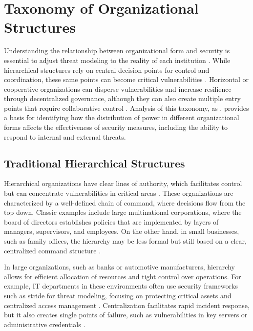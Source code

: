 \section{Taxonomy of Organizational Structures}
\label{sec:taxonomy_organizational_structures}

Understanding the relationship between organizational form and security is
essential to adjust threat modeling to the reality of each institution
\cite{Non-HierarchicalForms}. While hierarchical structures rely on central
decision points for control and coordination, these same points can become
critical vulnerabilities \cite{ThreatModelingdesigningForSecurity}. Horizontal
or cooperative organizations can disperse vulnerabilities and increase
resilience through decentralized governance, although they can also create
multiple entry points that require collaborative control \cite{Colbac}. Analysis
of this taxonomy, as \cite{WorkerCooperativesinAmerica,
RealNotNominalGlobalDemocracy}, provides a basis for identifying how the
distribution of power in different organizational forms affects the
effectiveness of security measures, including the ability to respond to internal
and external threats.

\subsection{Traditional Hierarchical Structures}
\label{subsec:traditional_hierarchical_structures}

Hierarchical organizations have clear lines of authority, which facilitates
control but can concentrate vulnerabilities in critical areas
\cite{MicrosoftThreatModelingTechnique}. These organizations are characterized
by a well-defined chain of command, where decisions flow from the top down.
Classic examples include large multinational corporations, where the board of
directors establishes policies that are implemented by layers of managers,
supervisors, and employees. On the other hand, in small businesses, such as
family offices, the hierarchy may be less formal but still based on a clear,
centralized command structure \cite{WorkerCooperativesinAmerica}.

In large organizations, such as banks or automotive manufacturers, hierarchy
allows for efficient allocation of resources and tight control over operations.
For example, IT departments in these environments often use security frameworks
such as \gls{stride} for threat modeling, focusing on protecting critical assets
and centralized access management \cite{MicrosoftThreatModelingTechnique,
ThreatModelingASystematicLiteratureReview}. Centralization facilitates rapid
incident response, but it also creates single points of failure, such as
vulnerabilities in key servers or administrative credentials
\cite{DoArtifactsHavePolitics, BigTech}.

